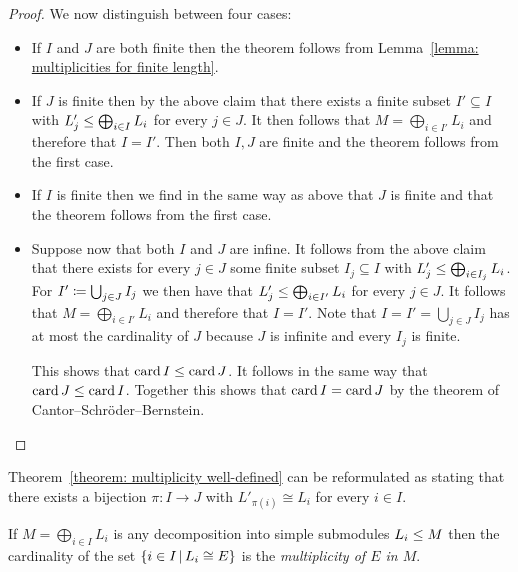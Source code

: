 \begin{proof}
  We now distinguish between four cases:
  \begin{itemize}
    \item 
      If $I$ and $J$ are both finite then the theorem follows from Lemma~\ref{lemma: multiplicities for finite length}.
    \item
      If $J$ is finite then by the above claim that there exists a finite subset $I' \subseteq I$ with $L'_j \leq \bigoplus_{i \in I} L_i$ for every $j \in J$.
      It then follows that $M = \bigoplus_{i \in I'} L_i$ and therefore that $I = I'$.
      Then both $I, J$ are finite and the theorem follows from the first case.
    \item
      If $I$ is finite then we find in the same way as above that $J$ is finite and that the theorem follows from the first case.
    \item
      Suppose now that both $I$ and $J$ are infine.
      It follows from the above claim that there exists for every $j \in J$ some finite subset $I_j \subseteq I$ with $L'_j \leq \bigoplus_{i \in I_j} L_i$.
      For $I' \coloneqq \bigcup_{j \in J} I_j$ we then have that $L'_j \leq \bigoplus_{i \in I'} L_i$ for every $j \in J$.
      It follows that $M = \bigoplus_{i \in I'} L_i$ and therefore that $I = I'$.
      Note that $I = I' = \bigcup_{j \in J} I_j$ has at most the cardinality of $J$ because $J$ is infinite and every $I_j$ is finite.
      
      This shows that $\operatorname{card}{I} \leq \operatorname{card}{J}$.
      It follows in the same way that $\operatorname{card}{J} \leq \operatorname{card}{I}$.
      Together this shows that $\operatorname{card}{I} = \operatorname{card}{J}$ by the theorem of Cantor--Schröder--Bernstein.
    \qedhere
  \end{itemize}
\end{proof}


\begin{remark}
  \label{remark: uniqueness of multiplicities alternative formulation}
  Theorem~\ref{theorem: multiplicity well-defined} can be reformulated as stating that there exists a bijection $\pi \colon I \to J$ with $L'_{\pi(i)} \cong L_i$ for every $i \in I$.
\end{remark}


\begin{definition}
  If $M = \bigoplus_{i \in I} L_i$ is any decomposition into simple submodules $L_i \leq M$ then the cardinality of the set $\{i \in I \suchthat L_i \cong E\}$ is the \emph{multiplicity of $E$ in $M$}.
\end{definition}





